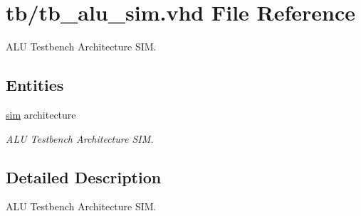 \hypertarget{tb__alu__sim_8vhd}{}\section{tb/tb\+\_\+alu\+\_\+sim.vhd File Reference}
\label{tb__alu__sim_8vhd}


A\+LU Testbench Architecture S\+IM.  


\subsection*{Entities}
\begin{DoxyCompactItemize}
\item 
\hyperlink{classtb__alu_1_1sim}{sim} architecture
\begin{DoxyCompactList}\small\item\em A\+LU Testbench Architecture S\+IM. \end{DoxyCompactList}\end{DoxyCompactItemize}


\subsection{Detailed Description}
A\+LU Testbench Architecture S\+IM. 

